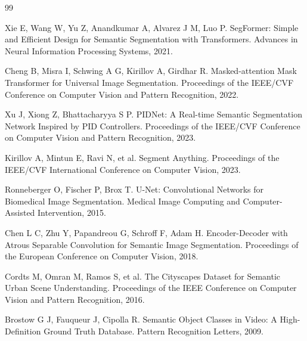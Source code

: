 \documentclass{report}
\begin{document}
\begin{thebibliography}{99}

Xie E, Wang W, Yu Z, Anandkumar A, Alvarez J M, Luo P.
SegFormer: Simple and Efficient Design for Semantic Segmentation with Transformers.
Advances in Neural Information Processing Systems, 2021.

Cheng B, Misra I, Schwing A G, Kirillov A, Girdhar R.
Masked-attention Mask Transformer for Universal Image Segmentation.
Proceedings of the IEEE/CVF Conference on Computer Vision and Pattern Recognition, 2022.

Xu J, Xiong Z, Bhattacharyya S P.
PIDNet: A Real-time Semantic Segmentation Network Inspired by PID Controllers.
Proceedings of the IEEE/CVF Conference on Computer Vision and Pattern Recognition, 2023.

Kirillov A, Mintun E, Ravi N, et al.
Segment Anything.
Proceedings of the IEEE/CVF International Conference on Computer Vision, 2023.

Ronneberger O, Fischer P, Brox T.
U-Net: Convolutional Networks for Biomedical Image Segmentation.
Medical Image Computing and Computer-Assisted Intervention, 2015.

Chen L C, Zhu Y, Papandreou G, Schroff F, Adam H.
Encoder-Decoder with Atrous Separable Convolution for Semantic Image Segmentation.
Proceedings of the European Conference on Computer Vision, 2018.

Cordts M, Omran M, Ramos S, et al.
The Cityscapes Dataset for Semantic Urban Scene Understanding.
Proceedings of the IEEE Conference on Computer Vision and Pattern Recognition, 2016.

Brostow G J, Fauqueur J, Cipolla R.
Semantic Object Classes in Video: A High-Definition Ground Truth Database.
Pattern Recognition Letters, 2009.

\end{thebibliography}
\end{document}
